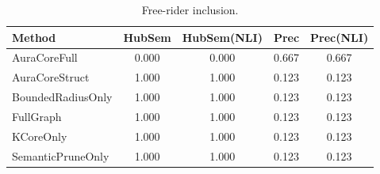 \begin{table}[t]\centering\small
\begin{tabular}{lcccc}
\toprule
Method & HubSem & HubSem(NLI) & Prec & Prec(NLI) \\
\midrule
AuraCoreFull & 0.000 & 0.000 & 0.667 & 0.667 \\
AuraCoreStruct & 1.000 & 1.000 & 0.123 & 0.123 \\
BoundedRadiusOnly & 1.000 & 1.000 & 0.123 & 0.123 \\
FullGraph & 1.000 & 1.000 & 0.123 & 0.123 \\
KCoreOnly & 1.000 & 1.000 & 0.123 & 0.123 \\
SemanticPruneOnly & 1.000 & 1.000 & 0.123 & 0.123 \\
\bottomrule
\end{tabular}
\caption{Free-rider inclusion.}
\end{table}
